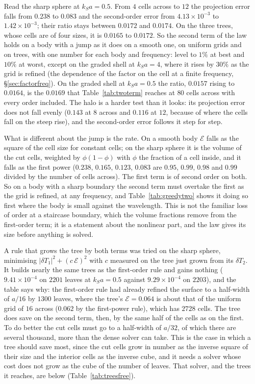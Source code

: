 \documentclass[11pt,a4paper]{article}
\newcommand{\cE}{\mathcal{E}}
\begin{document}
Read the sharp sphere at $k_Sa=0.5$. From $4$ cells across to $12$ the projection error falls from
$0.238$ to $0.083$ and the second-order error from $4.13\times10^{-3}$ to $1.42\times10^{-3}$; their ratio
stays between $0.0172$ and $0.0174$. On the three trees, whose cells are of four sizes, it is $0.0165$ to
$0.0172$. So the second term of the law holds on a body with a jump as it does on a smooth one, on
uniform grids and on trees, with one number for each body and frequency: level to $1\%$ at best and
$10\%$ at worst, except on the graded shell at $k_Sa=4$, where it rises by $30\%$ as the grid is refined
(the dependence of the factor on the cell at a finite frequency, \S\ref{sec:factorfreq}). On the graded
shell at $k_Sa=0.5$ the ratio, $0.0157$ rising to $0.0164$, is the $0.0169$ that Table~\ref{tab:twoterm}
reaches at $80$ cells across with every order included. The halo is a harder test than it looks: its
projection error does not fall evenly ($0.143$ at $8$ across and $0.116$ at $12$, because of where the
cells fall on the steep rise), and the second-order error follows it step for step.

What is different about the jump is the rate. On a smooth body $\cE$ falls as the square of the cell size
for constant cells; on the sharp sphere it is the volume of the cut cells, weighted by $\phi(1-\phi)$
with $\phi$ the fraction of a cell inside, and it falls as the first power ($0.238$, $0.165$, $0.123$,
$0.083$ are $0.95$, $0.99$, $0.98$ and $0.99$ divided by the number of cells across). The first term is of
second order on both. So on a body with a sharp boundary the second term must overtake the first as the
grid is refined, at any frequency, and Table~\ref{tab:greedytwo} shows it doing so first where the body
is small against the wavelength. This is not the familiar loss of order at a staircase boundary, which
the volume fractions remove from the first-order term; it is a statement about the nonlinear part, and
the law gives its size before anything is solved.

A rule that grows the tree by both terms was tried on the sharp sphere, minimising
$|\delta T_1|^2+(c\,\cE)^2$ with $c$ measured on the tree just grown from its $\delta T_2$. It builds
nearly the same trees as the first-order rule and gains nothing ($9.41\times10^{-4}$ on $2201$ leaves at
$k_Sa=0.5$ against $9.29\times10^{-4}$ on $2203$), and the table says why: the first-order rule had
already refined the surface to a half-width of $a/16$ by $1300$ leaves, where the tree's $\cE=0.064$ is
about that of the uniform grid of $16$ across ($0.062$ by the first-power rule), which has $2728$ cells. The tree does save on the second term, then, by the
same half of the cells as on the first. To do better the cut cells must go to a half-width of $a/32$, of which there are
several thousand, more than the dense solver can take. This is the case in which a tree should save most,
since the cut cells grow in number as the inverse square of their size and the interior cells as the
inverse cube, and it needs a solver whose cost does not grow as the cube of the number of leaves. That
solver, and the trees it reaches, are below (Table~\ref{tab:treesfree}).
\end{document}
